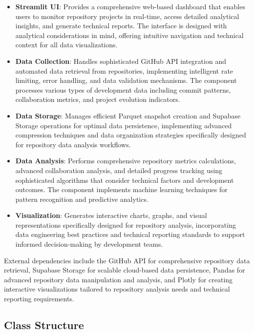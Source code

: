\documentclass[12pt,a4paper]{article}
\begin{document}
\begin{itemize}
\item \textbf{Streamlit UI}: Provides a comprehensive web-based dashboard that enables users to monitor repository projects in real-time, access detailed analytical insights, and generate technical reports. The interface is designed with analytical considerations in mind, offering intuitive navigation and technical context for all data visualizations.

\item \textbf{Data Collection}: Handles sophisticated GitHub API integration and automated data retrieval from repositories, implementing intelligent rate limiting, error handling, and data validation mechanisms. The component processes various types of development data including commit patterns, collaboration metrics, and project evolution indicators.

\item \textbf{Data Storage}: Manages efficient Parquet snapshot creation and Supabase Storage operations for optimal data persistence, implementing advanced compression techniques and data organization strategies specifically designed for repository data analysis workflows.

\item \textbf{Data Analysis}: Performs comprehensive repository metrics calculations, advanced collaboration analysis, and detailed progress tracking using sophisticated algorithms that consider technical factors and development outcomes. The component implements machine learning techniques for pattern recognition and predictive analytics.

\item \textbf{Visualization}: Generates interactive charts, graphs, and visual representations specifically designed for repository analysis, incorporating data engineering best practices and technical reporting standards to support informed decision-making by development teams.
\end{itemize}


External dependencies include the GitHub API for comprehensive repository data retrieval, Supabase Storage for scalable cloud-based data persistence, Pandas for advanced repository data manipulation and analysis, and Plotly for creating interactive visualizations tailored to repository analysis needs and technical reporting requirements.

\subsection{Class Structure}
\end{document}
